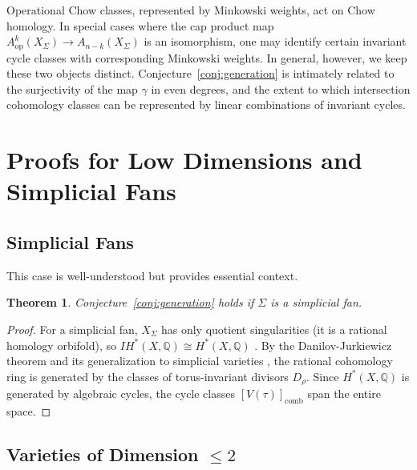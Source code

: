 \documentclass[12pt,reqno]{amsart}
\theoremstyle{plain}
\newtheorem{theorem}{Theorem}[section]
\theoremstyle{definition}
\newcommand{\IQ}{\mathbb{Q}}
\newcommand{\SigmaFan}{\Sigma}
\newcommand{\Chowh}[1]{A_{#1}}
\newcommand{\Chowop}[1]{A^{#1}_{\mathrm{op}}}
\begin{document}
	Operational Chow classes, represented by Minkowski weights, act on Chow homology. In special cases where the cap product map $\Chowop{k}(X_\SigmaFan) \to \Chowh{n-k}(X_\SigmaFan)$ is an isomorphism, one may identify certain invariant cycle classes with corresponding Minkowski weights. In general, however, we keep these two objects distinct. Conjecture~\ref{conj:generation} is intimately related to the surjectivity of the map $\gamma$ in even degrees, and the extent to which intersection cohomology classes can be represented by linear combinations of invariant cycles.
	
	\section{Proofs for Low Dimensions and Simplicial Fans}
	
	\subsection{Simplicial Fans}
	
	This case is well-understood but provides essential context.
	
	\begin{theorem}
		Conjecture~\ref{conj:generation} holds if $\SigmaFan$ is a simplicial fan.
	\end{theorem}
	\begin{proof}
		For a simplicial fan, $X_\SigmaFan$ has only quotient singularities (it is a rational homology orbifold), so $IH^*(X, \IQ) \cong H^*(X, \IQ)$ \cite[Corollary 1.2]{Fieseler91}. By the Danilov-Jurkiewicz theorem \cite{Danilov78} and its generalization to simplicial varieties \cite{Cox95, Fulton}, the rational cohomology ring is generated by the classes of torus-invariant divisors $D_\rho$. Since $H^*(X, \IQ)$ is generated by algebraic cycles, the cycle classes $[V(\tau)]_{\mathrm{comb}}$ span the entire space.
	\end{proof}
	
	\subsection{Varieties of Dimension $\le 2$}
	
\end{document}
